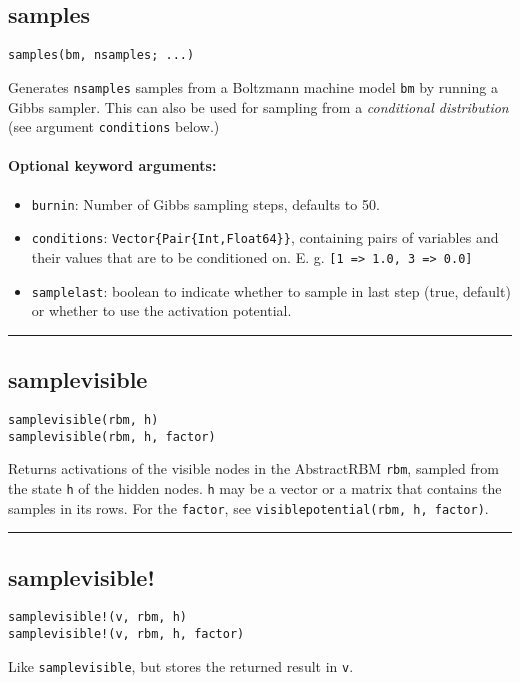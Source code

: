 \subsection*{samples}
\begin{verbatim}
samples(bm, nsamples; ...)
\end{verbatim}
Generates \texttt{nsamples} samples from a Boltzmann machine model \texttt{bm} by running a Gibbs sampler. This can also be used for sampling from a \emph{conditional distribution} (see argument \texttt{conditions} below.)

\paragraph*{Optional keyword arguments:}
\begin{itemize}
\item \texttt{burnin}: Number of Gibbs sampling steps, defaults to 50.


\item \texttt{conditions}: \texttt{Vector\{Pair\{Int,Float64\}\}}, containing pairs of variables and their values that are to be conditioned on. E. g. \texttt{[1 => 1.0, 3 => 0.0]}


\item \texttt{samplelast}: boolean to indicate whether to sample in last step (true, default) or whether to use the activation potential.

\end{itemize}
\noindent\rule{\textwidth}{1pt}
\subsection*{samplevisible}
\begin{verbatim}
samplevisible(rbm, h)
samplevisible(rbm, h, factor)
\end{verbatim}
Returns activations of the visible nodes in the AbstractRBM \texttt{rbm}, sampled from the state \texttt{h} of the hidden nodes. \texttt{h} may be a vector or a matrix that contains the samples in its rows. For the \texttt{factor}, see \texttt{visiblepotential(rbm, h, factor)}.

\noindent\rule{\textwidth}{1pt}
\subsection*{samplevisible!}
\begin{verbatim}
samplevisible!(v, rbm, h)
samplevisible!(v, rbm, h, factor)
\end{verbatim}
Like \texttt{samplevisible}, but stores the returned result in \texttt{v}.

